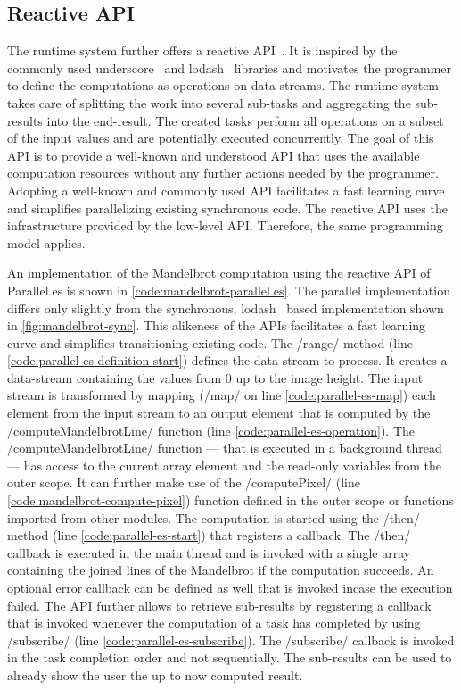 \subsection{Reactive API}
The runtime system further offers a reactive API~\cite{Meijer2012}. It is inspired by the commonly used underscore~\cite{underscorejs} and lodash~\cite{lodash} libraries and motivates the programmer to define the computations as operations on data-streams. The runtime system takes care of splitting the work into several sub-tasks and aggregating the sub-results into the end-result. The created tasks perform all operations on a subset of the input values and are potentially executed concurrently. The goal of this API is to provide a well-known and understood API that uses the available computation resources without any further actions needed by the programmer. Adopting a well-known and commonly used API facilitates a fast learning curve and simplifies parallelizing existing synchronous code. The reactive API uses the infrastructure provided by the low-level API. Therefore, the same programming model applies.


 An implementation of the Mandelbrot computation using the reactive API of Parallel.es is shown in \cref{code:mandelbrot-parallel.es}. The parallel implementation differs only slightly from the synchronous, lodash~\cite{lodash} based implementation shown in \cref{fig:mandelbrot-sync}. This alikeness of the APIs facilitates a fast learning curve and simplifies transitioning existing code. The \javascriptinline/range/ method (line \ref{code:parallel-es-definition-start}) defines the data-stream to process. It creates a data-stream containing the values from 0 up to the image height. The input stream is transformed by mapping (\javascriptinline/map/ on line \ref{code:parallel-es-map}) each element from the input stream to an output element that is computed by the \javascriptinline/computeMandelbrotLine/ function (line \ref{code:parallel-es-operation}). The \javascriptinline/computeMandelbrotLine/ function --- that is executed in a background thread --- has access to the current array element and the read-only variables from the outer scope. It can further make use of the \javascriptinline/computePixel/ (line \ref{code:mandelbrot-compute-pixel}) function defined in the outer scope or functions imported from other modules. The computation is started using the \javascriptinline/then/ method (line \ref{code:parallel-es-start}) that registers a callback. The \javascriptinline/then/ callback is executed in the main thread and is invoked with a single array containing the joined lines of the Mandelbrot if the computation succeeds. An optional error callback can be defined as well that is invoked incase the execution failed. The API further allows to retrieve sub-results by registering a callback that is invoked whenever the computation of a task has completed by using \javascriptinline/subscribe/ (line \ref{code:parallel-es-subscribe}). The \javascriptinline/subscribe/ callback is invoked in the task completion order and not sequentially. The sub-results can be used to already show the user the up to now computed result. 
 
